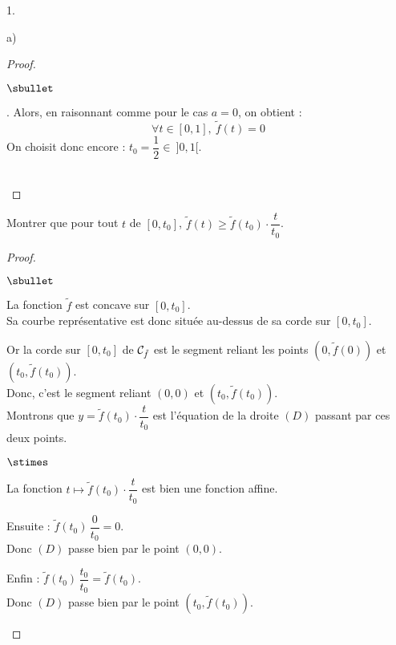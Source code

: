 \documentclass[11pt]{article}%
\begin{document}
\begin{noliste}{1.}
\begin{noliste}{a)}
\begin{proof}
\begin{noliste}{$\sbullet$}
      \item {}. Alors, en raisonnant comme pour le 
      cas $a=0$, on obtient :
      \[
        \forall t \in [0,1], \ \tilde{f}(t) =0
      \]
      On choisit donc encore : $t_0=\dfrac{1}{2} \in \ ]0,1[$.
    \end{noliste}
    \conc{Ainsi, il existe toujours $t_0 \in \ ]0,1[$ tel que :
    $\tilde{f}(t_0)=\dmax{t\in [0,1]} \tilde{f}(t)$.}~\\[-1cm]
  \end{proof}

 
  \item Montrer que pour tout $t$ de $[0,t_0]$, $\tilde{f}(t) \geq 
  \tilde{f}(t_0) \cdot \dfrac{t}{t_0}$. 
  
  \begin{proof}~
    \begin{noliste}{$\sbullet$}
      \item La fonction $\tilde{f}$ est concave sur $[0,t_0]$.\\
      Sa courbe représentative est donc située au-dessus de sa corde 
      sur $[0,t_0]$.
      
      \item Or la corde sur $[0,t_0]$ de ${\cal C}_{\tilde{f}}$ est le 
      segment 
      reliant les points $(0,\tilde{f}(0))$ et $(t_0,\tilde{f}(t_0))$.\\
      Donc, c'est le segment reliant 
      $(0,0)$ et $(t_0, \tilde{f}(t_0))$.\\
      Montrons que $y= \tilde{f}(t_0) \cdot \dfrac{t}{t_0}$ est 
      l'équation 
      de la droite $(D)$ passant par ces deux points.
      \begin{noliste}{$\stimes$}
        \item La fonction $t\mapsto \tilde{f}(t_0) \cdot 
	\dfrac{t}{t_0}$ est 
        bien une fonction affine.
        \item Ensuite : $\tilde{f}(t_0) \, \dfrac{0}{t_0} = 0$. \\[.1cm]
        Donc $(D)$ passe bien 
        par le point $(0,0)$.
        \item Enfin : $\tilde{f}(t_0) \, \dfrac{t_0}{t_0} = 
	\tilde{f}(t_0)$. \\[.1cm]
        Donc $(D)$ 
        passe bien par le point $(t_0,\tilde{f}(t_0))$.
      \end{noliste}



\end{noliste}
\end{proof}
\end{noliste}
\end{noliste}
\end{document}
